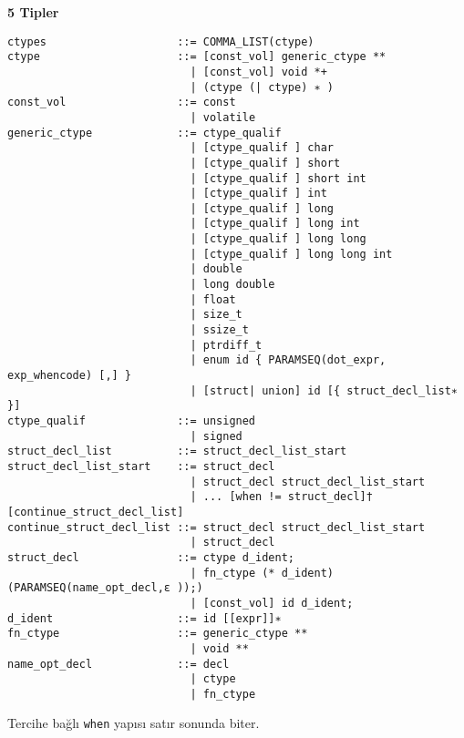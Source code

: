 \documentclass{article}
\begin{document}
\textbf{5 Tipler}
\\
\begin{lstlisting}
ctypes                    ::= COMMA_LIST(ctype)
ctype                     ::= [const_vol] generic_ctype **
                            | [const_vol] void *+
                            | (ctype (| ctype) ∗ )
const_vol                 ::= const
                            | volatile
generic_ctype             ::= ctype_qualif
                            | [ctype_qualif ] char
                            | [ctype_qualif ] short
                            | [ctype_qualif ] short int
                            | [ctype_qualif ] int
                            | [ctype_qualif ] long
                            | [ctype_qualif ] long int
                            | [ctype_qualif ] long long
                            | [ctype_qualif ] long long int
                            | double
                            | long double
                            | float
                            | size_t
                            | ssize_t
                            | ptrdiff_t
                            | enum id { PARAMSEQ(dot_expr, exp_whencode) [,] }
                            | [struct| union] id [{ struct_decl_list∗ }]
ctype_qualif              ::= unsigned
                            | signed
struct_decl_list          ::= struct_decl_list_start
struct_decl_list_start    ::= struct_decl
                            | struct_decl struct_decl_list_start
                            | ... [when != struct_decl]† [continue_struct_decl_list]
continue_struct_decl_list ::= struct_decl struct_decl_list_start
                            | struct_decl
struct_decl               ::= ctype d_ident;
                            | fn_ctype (* d_ident) (PARAMSEQ(name_opt_decl,ε ));)
                            | [const_vol] id d_ident;
d_ident                   ::= id [[expr]]∗
fn_ctype                  ::= generic_ctype **
                            | void **
name_opt_decl             ::= decl
                            | ctype
                            | fn_ctype
\end{lstlisting}
Tercihe bağlı \texttt{when} yapısı satır sonunda biter.
\end{document}
